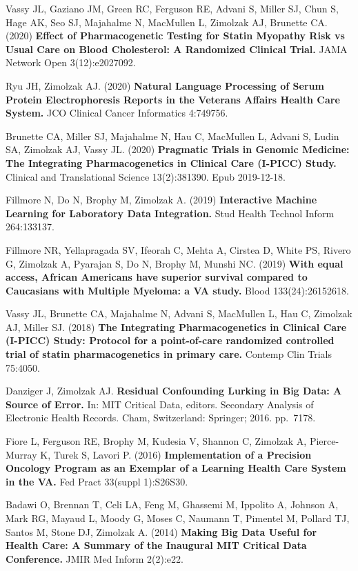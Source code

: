 \documentclass[10pt]{article}
\begin{document}
Vassy JL, Gaziano JM, Green RC, Ferguson RE, Advani S, Miller SJ, Chun
S, Hage AK, Seo SJ, Majahalme N, MacMullen L, Zimolzak AJ, Brunette
CA. (2020) \textbf{Effect of Pharmacogenetic Testing for Statin
  Myopathy Risk vs Usual Care on Blood Cholesterol: A Randomized
  Clinical Trial.} JAMA Network Open 3(12):e2027092.

Ryu JH, Zimolzak AJ. (2020) \textbf{Natural Language Processing of
  Serum Protein Electrophoresis Reports in the Veterans Affairs Health
  Care System.} JCO Clinical Cancer Informatics 4:749\ndash{}756.

Brunette CA, Miller SJ, Majahalme N, Hau C, MacMullen L, Advani S,
Ludin SA, Zimolzak AJ, Vassy JL. (2020) \textbf{Pragmatic Trials in
  Genomic Medicine: The Integrating Pharmacogenetics in Clinical Care
  (I-PICC) Study.} Clinical and Translational Science
13(2):381\ndash{}390. Epub 2019-12-18.

Fillmore N, Do N, Brophy M, Zimolzak A. (2019) \textbf{Interactive
  Machine Learning for Laboratory Data Integration.} Stud Health
Technol Inform 264:133\ndash{}137.

Fillmore NR, Yellapragada SV, Ifeorah C, Mehta A, Cirstea D, White PS,
Rivero G, Zimolzak A, Pyarajan S, Do N, Brophy M, Munshi NC. (2019)
\textbf{With equal access, African Americans have superior survival
  compared to Caucasians with Multiple Myeloma: a VA study.} Blood
133(24):2615\ndash{}2618.

Vassy JL, Brunette CA, Majahalme N, Advani S, MacMullen L, Hau C,
Zimolzak AJ, Miller SJ. (2018) \textbf{The Integrating
  Pharmacogenetics in Clinical Care (I-PICC) Study: Protocol for a
  point-of-care randomized controlled trial of statin pharmacogenetics
  in primary care.} Contemp Clin Trials 75:40\ndash{}50.

Danziger J, Zimolzak AJ. \textbf{Residual Confounding Lurking in Big
  Data: A Source of Error.} In: MIT Critical Data, editors. Secondary
Analysis of Electronic Health Records. Cham, Switzerland: Springer;
2016. pp.\ 71\ndash{}78.

Fiore L, Ferguson RE, Brophy M, Kudesia V, Shannon C, Zimolzak A,
Pierce-Murray K, Turek S, Lavori P. (2016) \textbf{Implementation of a
  Precision Oncology Program as an Exemplar of a Learning Health Care
  System in the VA.} Fed Pract 33(suppl 1):S26\ndash{}S30.

Badawi O, Brennan T, Celi LA, Feng M, Ghassemi M, Ippolito A, Johnson
A, Mark RG, Mayaud L, Moody G, Moses C, Naumann T, Pimentel M, Pollard
TJ, Santos M, Stone DJ, Zimolzak A. (2014) \textbf{Making Big Data
  Useful for Health Care: A Summary of the Inaugural MIT Critical Data
  Conference.} JMIR Med Inform 2(2):e22.
\end{document}
